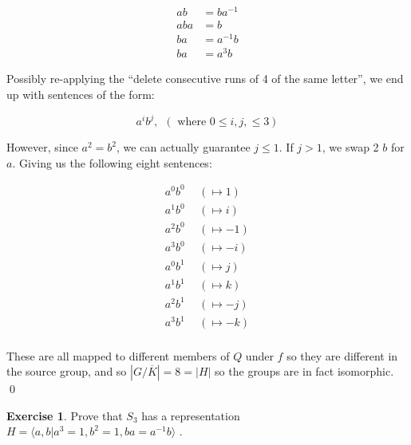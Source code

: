 \documentclass[11pt,oneside]{article}
\numberwithin{equation}{section}
\theoremstyle{definition}
\newtheorem{exercise}{Exercise}
\begin{document}
\begin{solution}
  \begin{align*}
    ab & = b a ^ {-1} \\
    aba & = b \\
    ba & = a ^ { -1 } b\\
    ba & = a ^ 3 b
  \end{align*}

  Possibly re-applying the ``delete consecutive runs of 4 of the same letter'', we end up with sentences of the form:

  \[
  a ^ i b ^ j, \ \ (\textrm{ where } 0 \leq i, j, \leq 3)
  \]

  However, since $a^2 = b^2$, we can actually guarantee $j \leq 1$.  If $j > 1$, we swap 2 $b$ for $a$.  Giving us
  the following eight sentences:

  \begin{align*}
    a^0 b^0 & \ \ ( \mapsto 1)\\
    a^1 b^0 & \ \ ( \mapsto i)\\
    a^2 b^0 & \ \ ( \mapsto -1)\\
    a^3 b^0 & \ \ ( \mapsto -i)\\
    a^0 b^1 & \ \ ( \mapsto j)\\
    a^1 b^1 & \ \ ( \mapsto k)\\
    a^2 b^1 & \ \ ( \mapsto -j)\\
    a^3 b^1 & \ \ ( \mapsto -k)\\
  \end{align*}

  These are all mapped to different members of $Q$ under $f$ so they are different in the source group, and
  so $|G / \overline K| = 8 = |H|$ so the groups are in fact isomorphic. \qed
  
\end{solution}

\begin{exercise}
Prove that $S_3$ has a representation $H = \langle a, b | a^3 =1, b^2 = 1, ba = a^{-1}b \rangle $ .  
\end{exercise}
\begin{solution}
  
\end{solution}

\begin{comment}
  \begin{exercise}
    problem
  \end{exercise}
  \begin{solution}
    \begin{enumerate}[(a)]
    \item
      first answer
    \end{enumerate}
  \end{solution}
\end{comment}
\end{document}
